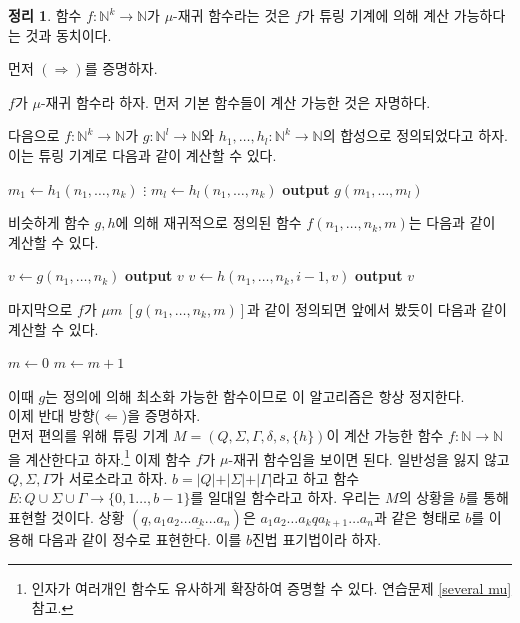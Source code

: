 \documentclass[b5paper, 11pt]{book}
\theoremstyle{definition}
\newtheorem{thm}[defn]{정리}
\newenvironment{pf*}{\pushQED{\qed}\pf}
{\popQED\endpf}
\begin{document}
\begin{thm}\label{mu eqauls tm}
    함수 $f: \mathbb{N}^k \rightarrow \mathbb{N}$가 $\mu$-재귀 함수라는 것은 $f$가 튜링 기계에 의해 계산 가능하다는 것과 동치이다.  
\end{thm}
\begin{pf*}
    먼저 $(\Rightarrow)$를 증명하자. 

    $f$가 $\mu$-재귀 함수라 하자. 먼저 기본 함수들이 계산 가능한 것은 자명하다. 

    다음으로 $f:\mathbb{N}^k \rightarrow \mathbb{N}$가  $g: \mathbb{N}^l \rightarrow \mathbb{N}$와 $h_1, \ldots, h_l:\mathbb{N}^k \rightarrow \mathbb{N}$의 합성으로 정의되었다고 하자. 이는 튜링 기계로 다음과 같이 계산할 수 있다.
    \begin{algorithmic}
        \State $m_1 \gets h_1(n_1, \ldots, n_k)$
        \State $\vdots$
        \State $m_l \gets h_l(n_1, \ldots, n_k)$
        \State \textbf{output} $g(m_1, \ldots, m_l)$
    \end{algorithmic}
    비슷하게 함수 $g, h$에 의해 재귀적으로 정의된 함수 $f(n_1, \ldots, n_k, m)$는 다음과 같이 계산할 수 있다.
    \begin{algorithmic}
        \State $v \gets g(n_1, \ldots, n_k)$
        \State \textbf{output} $v$
        \Else
        \State $v \gets h(n_1, \ldots, n_k, i-1, v)$
        \EndFor
        \State \textbf{output} $v$
        \EndIf
    \end{algorithmic}
    마지막으로 $f$가 $\mu m \; [g(n_1, \ldots, n_k, m)]$과 같이 정의되면 앞에서 봤듯이 다음과 같이 계산할 수 있다.
    \begin{algorithmic}
        \State $m \gets 0$
            \State $m \gets m+1$
        \EndWhile
    \end{algorithmic}
    이때 $g$는 정의에 의해 최소화 가능한 함수이므로 이 알고리즘은 항상 정지한다.\\
    이제 반대 방향($\Leftarrow$)을 증명하자.\\
    먼저 편의를 위해 튜링 기계 $M = (Q, \Sigma, \Gamma, \delta, s, \{h\})$이 계산 가능한 함수 $f: \mathbb{N} \rightarrow \mathbb{N}$을 계산한다고 하자.\footnote{인자가 여러개인 함수도 유사하게 확장하여 증명할 수 있다. 연습문제 \ref{several mu} 참고.} 이제 함수 $f$가 $\mu$-재귀 함수임을 보이면 된다. 일반성을 잃지 않고 $Q, \Sigma, \Gamma$가 서로소라고 하자. $b = \vert Q \vert + \vert \Sigma \vert  + \vert \Gamma \vert$라고 하고 함수 $E:Q \cup \Sigma \cup \Gamma \rightarrow \{0, 1  \ldots, b-1\}$를 일대일 함수라고 하자. 우리는 $M$의 상황을 $b$를 통해 표현할 것이다. 상황 $(q, a_1a_2 \ldots \underline{a_k} \ldots a_n)$은 $a_1a_2\ldots a_k q a_{k+1} \ldots a_n$과 같은 형태로  $b$를 이용해 다음과 같이 정수로 표현한다. 이를 $b$진법 표기법이라 하자. 

\end{pf*}
\end{document}
